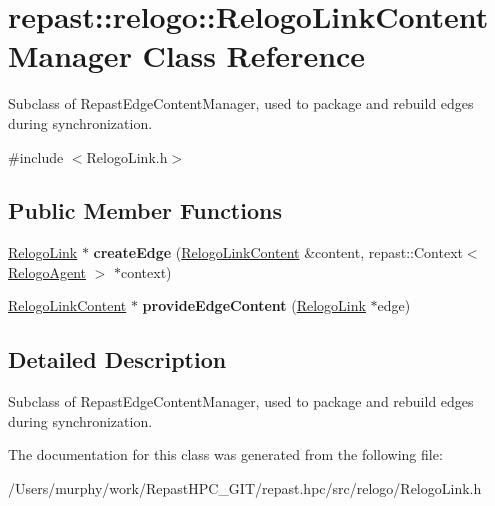 \hypertarget{classrepast_1_1relogo_1_1_relogo_link_content_manager}{\section{repast\-:\-:relogo\-:\-:Relogo\-Link\-Content\-Manager Class Reference}
\label{classrepast_1_1relogo_1_1_relogo_link_content_manager}
}


Subclass of Repast\-Edge\-Content\-Manager, used to package and rebuild edges during synchronization.  




{\ttfamily \#include $<$Relogo\-Link.\-h$>$}

\subsection*{Public Member Functions}
\begin{DoxyCompactItemize}
\item 
\hypertarget{classrepast_1_1relogo_1_1_relogo_link_content_manager_af34a2cc9aa6331c617de6e0af7a5eca4}{\hyperlink{classrepast_1_1relogo_1_1_relogo_link}{Relogo\-Link} $\ast$ {\bfseries create\-Edge} (\hyperlink{classrepast_1_1relogo_1_1_relogo_link_content}{Relogo\-Link\-Content} \&content, repast\-::\-Context$<$ \hyperlink{classrepast_1_1relogo_1_1_relogo_agent}{Relogo\-Agent} $>$ $\ast$context)}\label{classrepast_1_1relogo_1_1_relogo_link_content_manager_af34a2cc9aa6331c617de6e0af7a5eca4}

\item 
\hypertarget{classrepast_1_1relogo_1_1_relogo_link_content_manager_a4e85e7973518f8d58c0baaa2272f027e}{\hyperlink{classrepast_1_1relogo_1_1_relogo_link_content}{Relogo\-Link\-Content} $\ast$ {\bfseries provide\-Edge\-Content} (\hyperlink{classrepast_1_1relogo_1_1_relogo_link}{Relogo\-Link} $\ast$edge)}\label{classrepast_1_1relogo_1_1_relogo_link_content_manager_a4e85e7973518f8d58c0baaa2272f027e}

\end{DoxyCompactItemize}


\subsection{Detailed Description}
Subclass of Repast\-Edge\-Content\-Manager, used to package and rebuild edges during synchronization. 

The documentation for this class was generated from the following file\-:\begin{DoxyCompactItemize}
\item 
/\-Users/murphy/work/\-Repast\-H\-P\-C\-\_\-\-G\-I\-T/repast.\-hpc/src/relogo/Relogo\-Link.\-h\end{DoxyCompactItemize}
